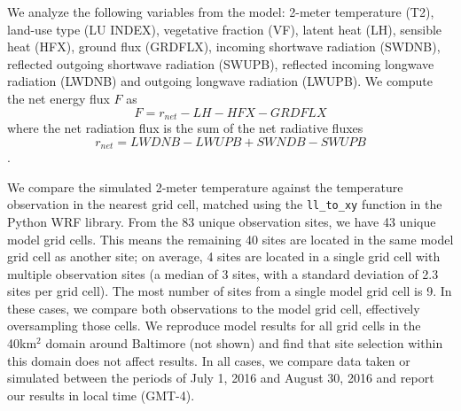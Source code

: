 \documentclass[draft,linenumbers]{agujournal}
\begin{document}
We analyze the following variables from the model: 2-meter temperature (T2),
 land-use type (LU INDEX), vegetative fraction (VF),
 latent heat (LH), 
 sensible heat (HFX), ground flux (GRDFLX), 
incoming shortwave radiation (SWDNB),
reflected outgoing shortwave radiation (SWUPB), 
reflected incoming longwave radiation (LWDNB) and outgoing longwave radiation (LWUPB).  
We compute the net energy flux $F$ as
\begin{equation}
F= r_{net} -LH - HFX - GRDFLX
\end{equation}
where the net radiation flux is the sum of the net radiative fluxes $$r_{net}=LWDNB - LWUPB+ SWNDB-SWUPB$$.

We compare the simulated 2-meter temperature against the temperature observation in the nearest grid cell, matched using the \texttt{ll{\_}to{\_}xy} function in the Python WRF library. 
From the 83 unique observation sites, we have 43 unique model grid cells. This means the remaining 40 sites are located in the same model grid cell as another site; on average, 4 sites are located in a single grid cell with multiple observation sites (a median of 3 sites, with a standard deviation of 2.3 sites per grid cell). The most number of sites from a single model grid cell is 9. In these cases, we compare both observations to the model grid cell, effectively oversampling those cells. 
We reproduce model results for all grid cells in the 40km$^2$ domain around Baltimore (not shown) and find that site selection within this domain does not affect results.%
In all cases, we compare data taken or simulated between the periods of July 1, 2016 and August 30, 2016 and report our results in local time (GMT-4). 
\end{document}
